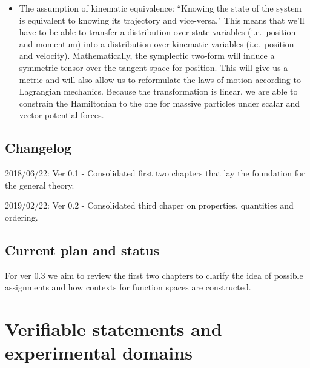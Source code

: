 \documentclass[11pt,letterpaper,fleqn]{memoir} %
\begin{document}
\begin{itemize}
	\item The assumption of kinematic equivalence: ``Knowing the state of the system is equivalent to knowing its trajectory and vice-versa." This means that we'll have to be able to transfer a distribution over state variables (i.e.~position and momentum) into a distribution over kinematic variables (i.e.~position and velocity). Mathematically, the symplectic two-form will induce a symmetric tensor over the tangent space for position. This will give us a metric and will also allow us to reformulate the laws of motion according to Lagrangian mechanics. Because the transformation is linear, we are able to constrain the Hamiltonian to the one for massive particles under scalar and vector potential forces.
\end{itemize}

\section*{Changelog}

\begin{description}
	\item 2018/06/22: Ver 0.1 - Consolidated first two chapters that lay the foundation for the general theory.
	\item 2019/02/22: Ver 0.2 - Consolidated third chaper on properties, quantities and ordering.
\end{description}

\section*{Current plan and status}

For ver 0.3 we aim to review the first two chapters to clarify the idea of possible assignments and how contexts for function spaces are constructed.

\cleardoublepage %

\tableofcontents* %

\cleardoublepage %


\mainmatter

\chapter{Verifiable statements and experimental domains}
\end{document}
